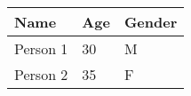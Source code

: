 \documentclass{article}
\begin{document}
\begin{tabular}{| l | l | l |}
\hline
Name & Age & Gender\\ \hline
Person 1
& 30
& M
\\ \hline

Person 2
& 35
& F
\\ \hline

\end{tabular}
\end{document}
